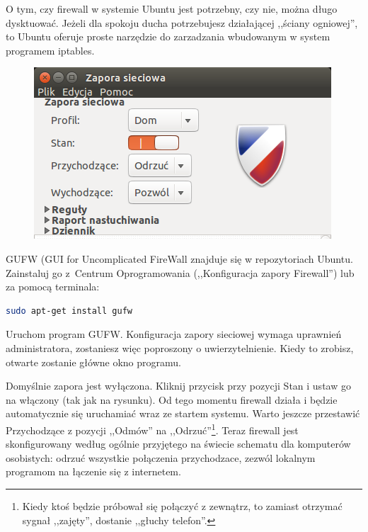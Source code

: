 O tym, czy firewall w systemie Ubuntu jest potrzebny, czy nie, można długo dysktuować. Jeżeli dla spokoju ducha potrzebujesz działającej ,,ściany ogniowej'', to Ubuntu oferuje proste narzędzie do zarzadzania wbudowanym w system programem iptables.

\begin{figure}
	\vspace{-10pt}
	\includegraphics[width=\linewidth]{images/programy_gufw.png}
\end{figure}

GUFW (\textcolor{ubuntu_orange}{GUI for Uncomplicated FireWall} znajduje się w repozytoriach Ubuntu. Zainstaluj go z~Centrum Oprogramowania (,,Konfiguracja zapory Firewall'') lub za pomocą terminala:
\begin{lstlisting}[language=bash]
sudo apt-get install gufw
\end{lstlisting}

Uruchom program GUFW. Konfiguracja zapory sieciowej wymaga uprawnień administratora, zostaniesz więc poproszony o uwierzytelnienie. Kiedy to zrobisz, otwarte zostanie główne okno programu.

Domyślnie zapora jest wyłączona. Kliknij przycisk przy pozycji \textcolor{ubuntu_orange}{Stan} i ustaw go na włączony (tak jak na rysunku). Od tego momentu firewall działa i będzie automatycznie się uruchamiać wraz ze startem systemu. Warto jeszcze przestawić \textcolor{ubuntu_orange}{Przychodzące} z pozycji ,,Odmów'' na ,,Odrzuć''\footnote{Kiedy ktoś będzie próbował się połączyć z zewnątrz, to zamiast otrzymać sygnał ,,zajęty'', dostanie ,,głuchy telefon''.}. Teraz firewall jest skonfigurowany według ogólnie przyjętego na świecie schematu dla komputerów osobistych: odrzuć wszystkie połączenia przychodzace, zezwól lokalnym programom na łączenie się z internetem.

